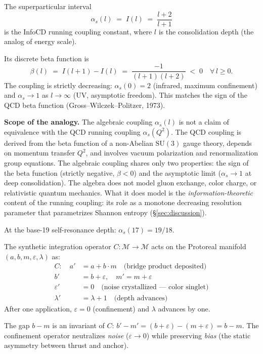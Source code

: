 The superparticular interval
\[
\alpha_s(l) \;=\; I(l) \;=\; \frac{l + 2}{l + 1}
\]
is the InfoCD running coupling constant, where $l$ is the
consolidation depth (the analog of energy scale).

Its discrete beta function is
\[
\beta(l) \;=\; I(l+1) - I(l) \;=\; \frac{-1}{(l+1)(l+2)} \;<\; 0
\quad \forall\, l \geq 0.
\]
The coupling is strictly decreasing: $\alpha_s(0) = 2$ (infrared,
maximum confinement) and $\alpha_s \to 1$ as $l \to \infty$ (UV,
asymptotic freedom). This matches the sign of the QCD beta function
(Gross--Wilczek--Politzer, 1973).

\textbf{Scope of the analogy.} The algebraic coupling $\alpha_s(l)$
is not a claim of equivalence with the QCD running coupling
$\alpha_s(Q^2)$. The QCD coupling is derived from the beta function
of a non-Abelian $\mathrm{SU}(3)$ gauge theory, depends on momentum
transfer $Q^2$, and involves vacuum polarization and renormalization
group equations. The algebraic coupling shares only two properties:
the sign of the beta function (strictly negative, $\beta < 0$) and
the asymptotic limit ($\alpha_s \to 1$ at deep consolidation). The
algebra does not model gluon exchange, color charge, or relativistic
quantum mechanics. What it does model is the \emph{information-theoretic}
content of the running coupling: its role as a monotone decreasing
resolution parameter that parametrizes Shannon entropy
(\S\ref{sec:discussion}).

At the base-19 self-resonance depth: $\alpha_s(17) = 19/18$.

The synthetic integration operator $C : \mathcal{M} \to \mathcal{M}$
acts on the Protoreal manifold $(a, b, m, \varepsilon, \lambda)$ as:
\begin{align}
C: \quad
a' &= a + b \cdot m \quad \text{(bridge product deposited)} \\
b' &= b + \varepsilon, \quad m' = m + \varepsilon \\
\varepsilon' &= 0 \quad \text{(noise crystallized --- color singlet)} \\
\lambda' &= \lambda + 1 \quad \text{(depth advances)}
\end{align}
After one application, $\varepsilon = 0$ (confinement) and
$\lambda$ advances by one.

\begin{proposition}
\label{prop:schwarzian}
The gap $b - m$ is an invariant of $C$:
$b' - m' = (b + \varepsilon) - (m + \varepsilon) = b - m$.
The confinement operator neutralizes \emph{noise}
($\varepsilon \to 0$) while preserving \emph{bias}
(the static asymmetry between thrust and anchor).
\end{proposition}

